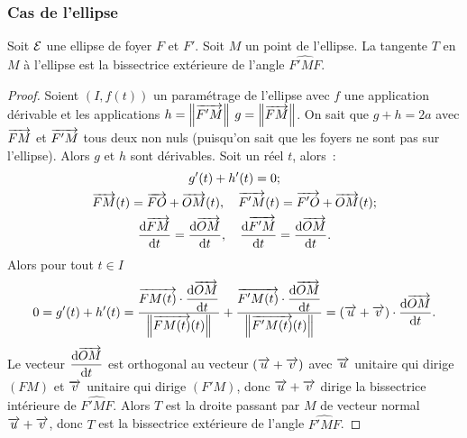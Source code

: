 \subsubsection{Cas de l'ellipse}
\begin{prop}
  Soit $\mathcal{E}$ une ellipse de foyer $F$ et $F'$. Soit $M$ un point de l'ellipse. La tangente $T$ en $M$ à l'ellipse est la bissectrice extérieure de l'angle $\widehat{F'MF}$.
\end{prop}
\begin{proof}
  Soient $(I,f(t))$ un paramétrage de l'ellipse avec $f$ une application dérivable et les applications $h=\left\lVert\overrightarrow{F'M}\right\rVert$ $g=\left\lVert\overrightarrow{FM}\right\rVert$. On sait que $g+h=2a$ avec $\overrightarrow{FM}$ et $\overrightarrow{F'M}$ tous deux non nuls (puisqu'on sait que les foyers ne sont pas sur l'ellipse). Alors $g$ et $h$ sont dérivables. Soit un réel $t$, alors~:
\begin{gather}
  g'(t)+h'(t)=0; \\
  \overrightarrow{FM}(t)=\overrightarrow{FO}+\overrightarrow{OM}(t), \quad \overrightarrow{F'M}(t)=\overrightarrow{F'O}+\overrightarrow{OM}(t);\\
  \dfrac{\mathrm{d} \overrightarrow{FM}}{\mathrm{d} t}=\dfrac{\mathrm{d} \overrightarrow{OM}}{\mathrm{d} t}, \quad \dfrac{\mathrm{d} \overrightarrow{F'M}}{\mathrm{d} t}=\dfrac{\mathrm{d} \overrightarrow{OM}}{\mathrm{d} t}.
\end{gather}
  Alors pour tout $t \in I$
  \begin{equation}
    0=g'(t)+h'(t)=\frac{\overrightarrow{FM(t)}\cdot\dfrac{\mathrm{d} \overrightarrow{OM}}{\mathrm{d} t}}{\left\lVert\overrightarrow{FM(t)}(t)\right\rVert} + \frac{\overrightarrow{F'M(t)}\cdot\dfrac{\mathrm{d} \overrightarrow{OM}}{\mathrm{d} t}}{\left\lVert\overrightarrow{F'M(t)}(t)\right\rVert}=(\overrightarrow{u}+\overrightarrow{v})\cdot \dfrac{\mathrm{d} \overrightarrow{OM}}{\mathrm{d} t}.
  \end{equation}
Le vecteur $\dfrac{\mathrm{d} \overrightarrow{OM}}{\mathrm{d} t}$ est orthogonal au vecteur $(\overrightarrow{u}+\overrightarrow{v})$ avec $\overrightarrow{u}$ unitaire qui dirige $(FM)$ et $\overrightarrow{v}$ unitaire qui dirige $(F'M)$, donc $\overrightarrow{u}+\overrightarrow{v}$ dirige la bissectrice intérieure de $\widehat{F'MF}$. Alors $T$ est la droite passant par $M$ de vecteur normal $\overrightarrow{u}+\overrightarrow{v}$, donc $T$ est la bissectrice extérieure de l'angle $\widehat{F'MF}$.
\end{proof}

